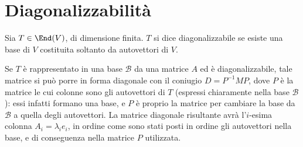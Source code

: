 \section{Diagonalizzabilità}
\begin{definizione}\label{d:endomorfismo-diagonalizzabile}
	Sia $T\in\End(V)$, di dimensione finita.
	$T$ si dice diagonalizzabile se esiste una base di $V$ costituita soltanto da autovettori di $V$.
\end{definizione}

Se $T$ è rappresentato in una base $\mathcal B$ da una matrice $A$ ed è diagonalizzabile, tale matrice si può porre in forma diagonale con il coniugio $D=P^{-1}MP$, dove $P$ è la matrice le cui colonne sono gli autovettori di $T$ (espressi chiaramente nella base $\mathcal B$): essi infatti formano una base, e $P$ è proprio la matrice per cambiare la base da $\mathcal B$ a quella degli autovettori.
La matrice diagonale risultante avrà l'$i$-esima colonna $A_i=\lambda_i e_i$, in ordine come sono stati posti in ordine gli autovettori nella base, e di conseguenza nella matrice $P$ utilizzata.

